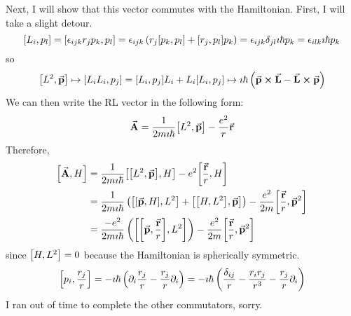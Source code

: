 \documentclass[a4paper,twoside]{article}
\begin{document}
\begin{problem}
    Next, I will show that this vector commutes with the Hamiltonian. First, I will take a slight detour.
    \begin{equation}
        \comm{L_i}{p_l} = \comm{\epsilon_{ijk} r_j p_k}{p_l} = \epsilon_{ijk} \left( r_j \comm{p_k}{p_l} + \comm{r_j}{p_l} p_k \right) = \epsilon_{ijk} \delta_{jl} \imath \hbar p_k = \epsilon_{ilk} \imath \hbar p_k
    \end{equation}
    so
    \begin{equation}
        \comm{L^2}{\va{p}} \mapsto \comm{L_i L_i}{p_j} = \comm{L_i}{p_j} L_i + L_i \comm{L_i}{p_j} \mapsto \imath \hbar \left( \va{p} \cross \va{L} - \va{L} \cross \va{p} \right)
    \end{equation}
    We can then write the RL vector in the following form:
    \begin{equation}
        \va{A} = \frac{1}{2m \imath \hbar} \comm{L^2}{\va{p}} - \frac{e^2}{r} \va{r}
    \end{equation}
    Therefore,
    \begin{align}
        \comm{\va{A}}{H} &= \frac{1}{2m \imath \hbar} \comm{\comm{L^2}{\va{p}}}{H} - e^2 \comm{\frac{\va{r}}{r}}{H} \\
        &= \frac{1}{2m \imath \hbar} \left( \comm{\comm{\va{p}}{H}}{L^2} + \comm{\comm{H}{L^2}}{\va{p}} \right) - \frac{e^2}{2m} \comm{\frac{\va{r}}{r}}{\va{p}^2} \\
        &= \frac{- e^2}{2m \imath \hbar} \left(\comm{\comm{\va{p}}{\frac{\va{r}}{r}}}{L^2}\right) - \frac{e^2}{2m} \comm{\frac{\va{r}}{r}}{\va{p}^2}
    \end{align}
    since $ \comm{H}{L^2} = 0 $ because the Hamiltonian is spherically symmetric.
    \begin{equation}
        \comm{p_i}{\frac{r_j}{r}} = - \imath \hbar \left( \partial_i \frac{r_j}{r} - \frac{r_j}{r} \partial_i \right) = - \imath \hbar \left( \frac{\delta_{ij}}{r} - \frac{r_i r_j}{r^3} - \frac{r_j}{r} \partial_i \right)
    \end{equation}
    I ran out of time to complete the other commutators, sorry.
\end{problem}
\end{document}
